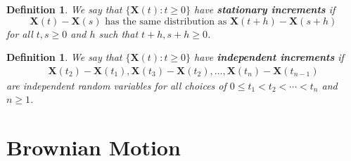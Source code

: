\documentclass[10pt]{article}
\newtheorem{definition}[lemma]{Definition}
\newcommand{\ve}[1]{\mathbf{#1}}
\begin{document}
\begin{itemize}
  \begin{definition}
    We say that $\{ \ve{X}(t) : t \geq 0\}$ have {\bf stationary increments} if $$\ve{X}(t) - \ve{X}(s) \mbox{ has the same distribution as } \ve{X}(t+h) - \ve{X}(s+h)$$ for all $t,s \geq 0$ and $h$ such that $t+h,s+h \geq 0$.
  \end{definition}

  \begin{definition}
    We say that $\{ \ve{X}(t) : t \geq 0\}$ have {\bf independent increments} if
    \begin{align*}
      \ve{X}(t_2) - \ve{X}(t_1), \ve{X}(t_3) - \ve{X}(t_2), \dotsc, \ve{X}(t_n) - \ve{X}(t_{n-1})
    \end{align*}
    are independent random variables for all choices of $0 \leq t_1 < t_2 < \dotsb < t_n$ and $n \geq 1$.
  \end{definition}
\end{itemize}

\section{Brownian Motion}
\end{document}

